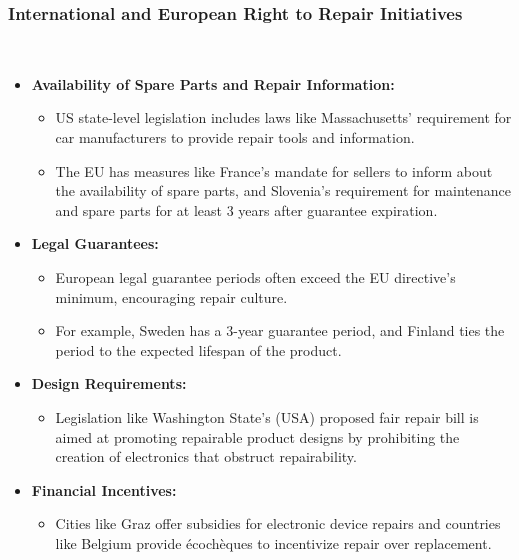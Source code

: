 \subsubsection{International and European Right to Repair Initiatives}~\cite{svensson2018repair, hernandez2020repair, eu2019repair}
\begin{itemize}
    \item \textbf{Availability of Spare Parts and Repair Information:}
          \begin{itemize}
              \item US state-level legislation includes laws like Massachusetts' requirement for
                    car manufacturers to provide repair tools and information.
              \item The EU has measures like France's mandate for sellers to inform about the
                    availability of spare parts, and Slovenia's requirement for maintenance and
                    spare parts for at least 3 years after guarantee expiration.
          \end{itemize}

    \item \textbf{Legal Guarantees:}
          \begin{itemize}
              \item European legal guarantee periods often exceed the EU directive's minimum,
                    encouraging repair culture.
              \item For example, Sweden has a 3-year guarantee period, and Finland ties the period
                    to the expected lifespan of the product.
          \end{itemize}

    \item \textbf{Design Requirements:}
          \begin{itemize}
              \item Legislation like Washington State's (USA) proposed fair repair bill is aimed
                    at promoting repairable product designs by prohibiting the creation of
                    electronics that obstruct repairability.
          \end{itemize}

    \item \textbf{Financial Incentives:}
          \begin{itemize}
              \item Cities like Graz offer subsidies for electronic device repairs and countries
                    like Belgium provide écochèques to incentivize repair over replacement.
          \end{itemize}


\end{itemize}
